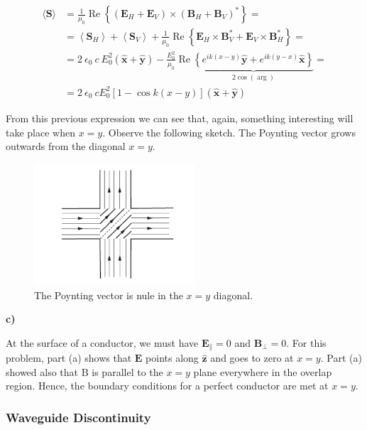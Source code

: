\begin{equation}
	\begin{split}
		\langle\mathbf{S}\rangle &=\frac{1}{ \mu_{0}} \operatorname{Re}\left\{\left(\mathbf{E}_{H}+\mathbf{E}_{V}\right) \times\left(\mathbf{B}_{H}+\mathbf{B}_{V}\right)^{*}\right\}= \\
		&=\left\langle\mathbf{S}_{H}\right\rangle+\left\langle\mathbf{S}_{V}\right\rangle+\frac{1}{ \mu_{0}} \operatorname{Re}\left\{\mathbf{E}_{H} \times \mathbf{B}_{V}^{*}+\mathbf{E}_{V} \times \mathbf{B}_{H}^{*}\right\} =\\
		&= 2\: \epsilon_{0} \:c \: E_{0}^{2}(\hat{\mathbf{x}}+\hat{\mathbf{y}})-\frac{E_{0}^{2}  }{ \mu_{0}} \operatorname{Re}\underbrace{\left\{e^{i k(x-y)} \hat{\mathbf{y}}+e^{i k(y-x)} \hat{\mathbf{x}}\right\}}_{2\cos(\arg)} =\\
		&=2\:\epsilon_{0}\:c E_{0}^{2}[1- \cos k(x-y)](\hat{\mathbf{x}}+\hat{\mathbf{y}})
	\end{split}
\end{equation}

From this previous expression we can see that, again, something interesting will take place when $x=y$. Observe the following sketch. The Poynting vector grows outwards from the diagonal $x=y$.

\begin{figure}[h!]
	\includegraphics[width=6cm]{figures/electrocrosswalk.png}
	\centering
	\caption{The Poynting vector is nule in the $x=y$ diagonal.}
\end{figure}

\textbf{c)}

At the surface of a conductor, we must have $\mathbf{E}_{\|}=0$ and $\mathbf{B}_{\perp}=0$. For this problem, part (a) shows that $\mathbf{E}$ points along $\hat{\mathbf{z}}$ and goes to zero at $x=y .$ Part (a) showed also that $\mathrm{B}$ is parallel to the $x=y$ plane everywhere in the overlap region. Hence, the boundary conditions for a perfect conductor are met at $x=y$.

\subsubsection{Waveguide Discontinuity}\label{Waveguide Discontinuity}

